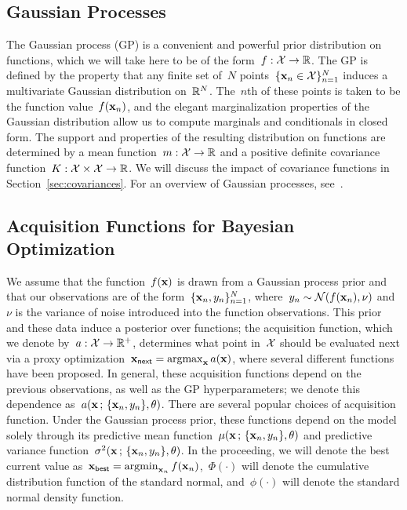 \documentclass[aos,preprint]{imsart}
\begin{document}
\subsection{Gaussian Processes}
The Gaussian process (GP) is a convenient and powerful prior
distribution on functions, which we will take here to be of the
form~${f:\mathcal{X}\to\mathbb{R}}$.  The GP is defined by the property that any
finite set of~$N$ points~$\{\boldsymbol{\mathrm{x}}_n\in\mathcal{X}\}^N_{n=1}$ induces a
multivariate Gaussian distribution on~$\mathbb{R}^N$.  The~$n$th of these
points is taken to be the function value~$f(\boldsymbol{\mathrm{x}}_n)$, and the elegant
marginalization properties of the Gaussian distribution allow us to
compute marginals and conditionals in closed form.  The support and
properties of the resulting distribution on functions are determined
by a mean function~${m:\mathcal{X}\to\mathbb{R}}$ and a positive definite
covariance function~${K:\mathcal{X}\times\mathcal{X}\to\mathbb{R}}$.  We will discuss
the impact of covariance functions in Section~\ref{sec:covariances}.
For an overview of Gaussian processes, see~\citet{Rasmussen2006}.

\subsection{Acquisition Functions for Bayesian Optimization}
We assume that the function~$f(\boldsymbol{\mathrm{x}})$ is drawn from a Gaussian
process prior and that our observations are of the
form~$\{\boldsymbol{\mathrm{x}}_n,y_n\}^N_{n=1}$,
where~${y_n\sim\mathcal{N}(f(\boldsymbol{\mathrm{x}}_n),\nu)}$ and~$\nu$ is the variance
of noise introduced into the function observations.  This prior and
these data induce a posterior over functions; the acquisition
function, which we denote by~${a:\mathcal{X}\to\mathbb{R}^{+}}$, determines what
point in~$\mathcal{X}$ should be evaluated next via a proxy
optimization~${\brmx_{\sf{next}} = \argmax_{\brmx} a(\brmx)}$, where
several different functions have been proposed.  In general, these
acquisition functions depend on the previous observations,
as well as the GP hyperparameters; we denote this dependence
as~$a(\boldsymbol{\mathrm{x}}\,;\,\{\boldsymbol{\mathrm{x}}_n,y_n\},\theta)$.  There are several popular
choices of acquisition function.  Under the Gaussian process prior,
these functions depend on the model solely through its predictive mean
function~$\mu(\boldsymbol{\mathrm{x}}\,;\,\{\boldsymbol{\mathrm{x}}_n,y_n\},\theta)$ and predictive
variance function~$\sigma^2(\boldsymbol{\mathrm{x}}\,;\,\{\boldsymbol{\mathrm{x}}_n,y_n\},\theta)$.  In
the proceeding, we will denote the best current value
as~${\brmx_{\sf{best}}=\argmin_{\brmx_n}f(\brmx_n)}$,~$\Phi(\cdot)$
will denote the cumulative distribution function of the standard
normal, and~$\phi(\cdot)$ will denote the standard normal density
function.
\end{document}
